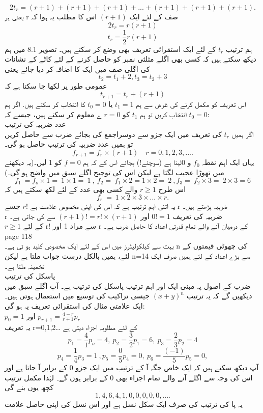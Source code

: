 \[ 2t_{r} = (r + 1) + (r + 1) + (r + 1) + ...  + (r + 1) + (r + 1) + (r + 1) .\]
یعنی ہر 
r
صف کے لئے ایک 
\((r+1)\)
اس کا مطلب یہ ہوا کہ
\[2t_{r}=r(r+1)\]
\[t_{r}=\frac{1}{2}r(r+1)\]
ہم ترتیب 
\(t_{r}\)
کے لئے ایک استقرائی تعریف بھی وضع کر سکتے ہیں۔ تصویر 8.1 میں ہم دیکھ سکتے ہیں کہ کسی بھی اگلے مثلثی نمبر کو حاصل کرنے کے لئے کاٹے کے نشانات کی اگلی صف میں ایک کا اضافہ کر دیا جائے یعنی
\[t_{2}=t_{1}+2, t_{3}=t_{2}+3\]
عمومی طور پر لکھا جا سکتا ہے کہ
\[t_{r+1}=t_{r}+(r+1)\]
اس تعریف کو مکمل کرنے کی غرض سے ہم 
\(t_{1}=1\)
یا
\(t_{0}=0\)
کا انتخاب کر سکتے ہیں.
اگر ہم 
\(t_{0}=0\)
انتخاب کریں تو ہم 
\(t_{1}\)
کو
\(r=0\)
ے معلوم کر سکتے ہیں، جیسے کہ:\\

عدد ضربیہ کی ترتیب\\
اگر ہمیں 
\(t_{r}\)
کی تعریف میں ایک جزو سے دوسراجمع کی بجائے ضرب سے حاصل کریں تو ہمیں عدد ضربیہ کی ترتیب حاصل ہو گی۔\\
\[f_{r+1} = f_{r} \times (r+1)\quad r =0,1,2,3, .... \]
یہاں ایک اہم نقطہ 
\(f_{0}\)
و 0لینا ہے (سوچئے!) بجائے اس کے کہ ہم
\(f=0\)
کو 
1
لیں۔(یہ دیکھنے میں تھوڑا عجیب لگتا ہے لیکن اس کی توجیح اگلے سبق میں واضح ہو گی۔)\\
\[f_{1}\ = f_{o} \times 1 =\ 1 \times 1 =\ 1\ ,\ f_{2} =\ f_{1} \times 2 = 1 \times 2 =\ 2\ , f_{3} =\  f_{2} \times 3 =\ 2 \times 3 = 6 \]
اس طرح 
\(r\ge 1\)
والے کسی بھی عدد کے لئے لکھ سکتے ہیں کہ\\
\[f_{r}\ =\ 1 \times 2 \times 3 \times  ... \times r. \]
یہ اتنی اہم ترتیب ہے کہ اس کی اپنی مخصوص علامت ہے
\(r!\)
جسے
r
ضربیہ پڑھتے ہیں۔\\
r
ضربیہ کی تعریف 
\(0!=1\)
اور
\((r+1)!=r!\times (r+1)\)
سے کی جاتی ہے۔\\
\(r\ge 1\)
کے لئے 
r!
سے مراد 
1
اور
r
کے درمیان آنے والے تمام قدرتی اعداد کا حاصل ضرب ہے۔\\
\clearpage
page 118 \\
بہت سے کیلکولیٹرز میں اس کے لئے ایک مخصوص کلید  ہو تی ہے۔
 n
  کی چھوٹی قیمتوں کے لئے، ہمیں بالکل درست جواب ملتا ہے لیکن
 n=14
    سے بڑے اعداد کے لئے ہمیں صرف ایک تخمینہ ملتا ہے۔\\
    پاسکل کی ترتیب\\
    ضرب کے اصول پہ مبنی ایک اور اہم ترتیب پاسکل کی ترتیب ہے۔  آپ اگلے سبق میں دیکھیں گے کہ یہ ترتیب 
\((x+y)^{n}\)
     جیسی تراکیب کی توسیع میں استعمال ہوتی ہیں۔ ایک علامتی مثال کی استقرائی تعریف یہ ہو گی:\\
     \( p_{0} =1\)
     اور
     \( p_{r+1} = \frac{4 - r}{r + 1}p_{r}\)\\
     یہ تعریف
 r=0,1,2…
       کے لئے مطلوبہ اجزاء دیتی ہے\\
       \[ p_{1} = \frac{4}{1} p_{o} = 4 , \: p_{2} = \frac{3}{2} p_{1} = 6 ,\: p_{3}= \frac{2}{3}p_{2} = 4 \]
\[ p_{4} = \frac{1}{4}p_{3} = 1 \: , p_{5} = \frac{0}{5}p_{4} = 0 , \: p_{6} =\frac{(-1)}{5}p_{5} = 0,\]
       آپ دیکھ سکتے ہیں کہ ایک خاص جگہ آ کے ترتیب میں ایک جزو 0 کے برابر آ جاتا ہے اور اس کی وجہ سے اگلے آنے والے تمام اجزاء بھی 0 کے برابر ہوں گے۔ لہٰذا مکمل ترتیب کچھ یوں بنے گی\\
 \[1 , 4 , 6 , 4 , 1 , 0 , 0 , 0 , 0 , 0 , ....\]
 یہ پا کی ترتیب کی صرف ایک سکل نسل ہے اور اس نسل کی اپنی خاصل علامت
 
